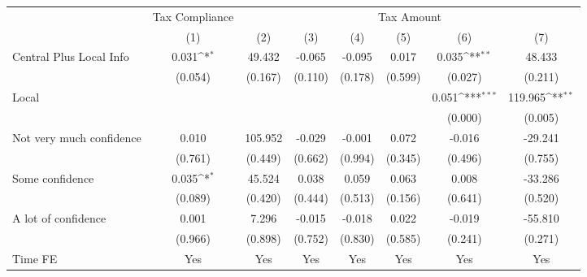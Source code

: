 {
\def\sym#1{\ifmmode^{#1}\else\(^{#1}\)\fi}
\begin{tabular}{l*{7}{c}}
\toprule
                &\multicolumn{1}{c}{Tax Compliance}&\multicolumn{6}{c}{Tax Amount}                                                                                   \\
                &\multicolumn{1}{c}{(1)}         &\multicolumn{1}{c}{(2)}         &\multicolumn{1}{c}{(3)}         &\multicolumn{1}{c}{(4)}         &\multicolumn{1}{c}{(5)}         &\multicolumn{1}{c}{(6)}         &\multicolumn{1}{c}{(7)}         \\
\midrule
Central Plus Local Info&    0.031\sym{*}  &   49.432         &   -0.065         &   -0.095         &    0.017         &    0.035\sym{**} &   48.433         \\
                &  (0.054)         &  (0.167)         &  (0.110)         &  (0.178)         &  (0.599)         &  (0.027)         &  (0.211)         \\
Local           &                  &                  &                  &                  &                  &    0.051\sym{***}&  119.965\sym{**} \\
                &                  &                  &                  &                  &                  &  (0.000)         &  (0.005)         \\
Not very much confidence&    0.010         &  105.952         &   -0.029         &   -0.001         &    0.072         &   -0.016         &  -29.241         \\
                &  (0.761)         &  (0.449)         &  (0.662)         &  (0.994)         &  (0.345)         &  (0.496)         &  (0.755)         \\
Some confidence &    0.035\sym{*}  &   45.524         &    0.038         &    0.059         &    0.063         &    0.008         &  -33.286         \\
                &  (0.089)         &  (0.420)         &  (0.444)         &  (0.513)         &  (0.156)         &  (0.641)         &  (0.520)         \\
A lot of confidence&    0.001         &    7.296         &   -0.015         &   -0.018         &    0.022         &   -0.019         &  -55.810         \\
                &  (0.966)         &  (0.898)         &  (0.752)         &  (0.830)         &  (0.585)         &  (0.241)         &  (0.271)         \\
Time FE         &      Yes         &      Yes         &      Yes         &      Yes         &      Yes         &      Yes         &      Yes         \\

\end{tabular}}
